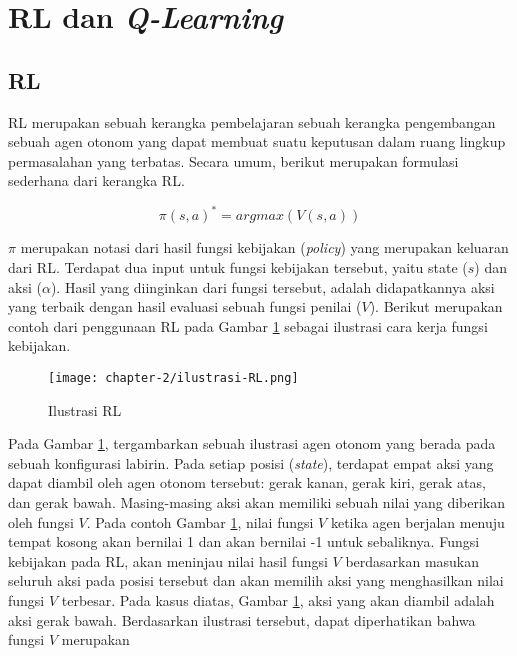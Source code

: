 \section{\acl{RL} dan \textit{Q-Learning}}
\subsection{\acl{RL}}
\label{sub:sub-rl}

\acf{RL} merupakan sebuah kerangka pembelajaran sebuah kerangka pengembangan sebuah agen otonom yang dapat membuat suatu keputusan dalam ruang lingkup permasalahan yang terbatas. Secara umum, berikut merupakan formulasi sederhana dari kerangka \ac{RL}.

\begin{equation}
	\pi(s,a)^* = argmax(V(s,a))
\end{equation}

\(\pi\) merupakan notasi dari hasil fungsi kebijakan (\textit{policy}) yang merupakan keluaran dari \ac{RL}. Terdapat dua input untuk fungsi kebijakan tersebut, yaitu state (\(s\)) dan aksi (\(\alpha\)). Hasil yang diinginkan dari fungsi tersebut, adalah didapatkannya aksi yang terbaik dengan hasil evaluasi sebuah fungsi penilai (\(V\)). Berikut merupakan contoh dari penggunaan \ac{RL} pada Gambar \ref{fig:ilustrasi-RL} sebagai ilustrasi cara kerja fungsi kebijakan.

\begin{figure}[h]
	\centering
	\texttt{[image: chapter-2/ilustrasi-RL.png]}
	\caption{Ilustrasi \ac{RL}}
	\label{fig:ilustrasi-RL}
\end{figure}


Pada Gambar \ref{fig:ilustrasi-RL}, tergambarkan sebuah ilustrasi agen otonom yang berada pada sebuah konfigurasi labirin. Pada setiap posisi (\textit{state}), terdapat empat aksi yang dapat diambil oleh agen otonom tersebut: gerak kanan, gerak kiri, gerak atas, dan gerak bawah. Masing-masing aksi akan memiliki sebuah nilai yang diberikan oleh fungsi \(V\). Pada contoh Gambar \ref{fig:ilustrasi-RL}, nilai fungsi \(V\) ketika agen berjalan menuju tempat kosong akan bernilai 1 dan akan bernilai -1 untuk sebaliknya. Fungsi kebijakan pada \ac{RL}, akan meninjau nilai hasil fungsi \(V\) berdasarkan masukan seluruh aksi pada posisi tersebut dan akan memilih aksi yang menghasilkan nilai fungsi \(V\) terbesar. Pada kasus diatas, Gambar \ref{fig:ilustrasi-RL}, aksi yang akan diambil adalah aksi gerak bawah. Berdasarkan ilustrasi tersebut, dapat diperhatikan bahwa fungsi \(V\) merupakan

